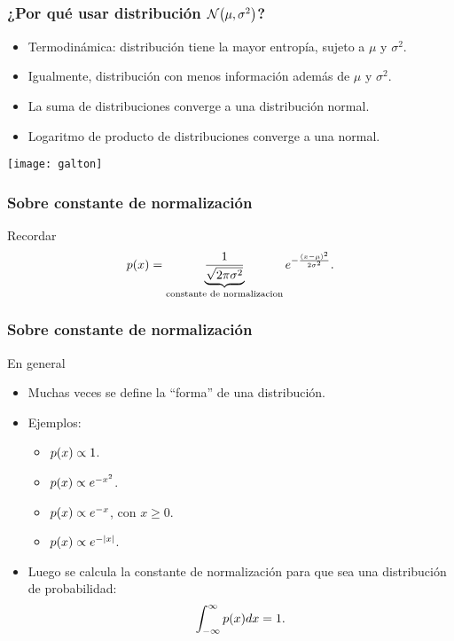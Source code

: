 \documentclass[table]{beamer}
\begin{document}
\begin{frame}
    \frametitle{¿Por qué usar distribución $\normal{\mu}{\sigma^{2}}$?}
    \begin{block}{}
        \begin{itemize}
            \item Termodinámica: distribución tiene la mayor entropía, sujeto a $\mu$ y $\sigma^{2}$.
            \item Igualmente, distribución con menos información además de $\mu$ y $\sigma^{2}$.
            \item La suma de distribuciones converge a una distribución normal.
            \item Logaritmo de producto de distribuciones converge a una normal.
        \end{itemize}
    \end{block}
    \begin{center}
        \texttt{[image: galton]}
    \end{center}
\end{frame}

\begin{frame}
    \frametitle{Sobre constante de normalización}
    \begin{block}{Recordar}
        \begin{equation*}
            \pdf{x} = \underbrace{\frac{1}{\sqrt{2 \pi \sigma^{2}}}}_{\text{constante de normalizacion}} e^{- \frac{\parens{x - \mu}^{2}}{2 \sigma^{2}}} .
        \end{equation*}
    \end{block}
    \end{frame}

\begin{frame}
    \frametitle{Sobre constante de normalización}

    \begin{block}{En general}
        \begin{itemize}
            \item Muchas veces se define la ``forma'' de una distribución.
            \item Ejemplos:
                \begin{itemize}
                    \item $\pdf{x} \propto 1$.
                    \item $\pdf{x} \propto e^{- x^{2}}$.
                    \item $\pdf{x} \propto e^{- x}$, con $x \geq 0$.
                    \item $\pdf{x} \propto e^{- \vparens{x}}$.
                \end{itemize}
            \item Luego se calcula la constante de normalización para que sea una distribución de probabilidad:
                \begin{equation*}
                    \int_{- \infty}^{\infty} \pdf{x} d x = 1.
                \end{equation*}
        \end{itemize}
    \end{block}
\end{frame}
\end{document}
